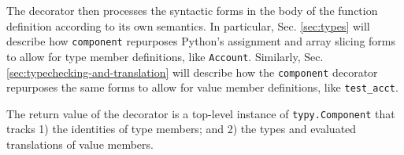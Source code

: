 \documentclass[10pt]{sigplanconf}
\newcommand{\typy}{\texttt{\footnotesize typy}}
\newcommand{\lip}[1]{\lstinline[language=Python,basicstyle=\ttfamily\footnotesize,morekeywords={with},deletendkeywords={tuple,buffer,map}]{#1}}
\newcommand{\li}[1]{\lip{#1}}
\begin{document}
The decorator then processes the syntactic forms in the body of the function definition according to its own semantics. In particular, Sec. \ref{sec:types} will describe how \lip{component} repurposes Python's assignment and array slicing forms to allow for type member definitions, like \li{Account}. Similarly, Sec. \ref{sec:typechecking-and-translation} will describe how the \lip{component} decorator repurposes the same forms to allow for value member definitions, like \li{test_acct}. 

The return value of the decorator is a top-level instance of \lip{typy.Component} that tracks 1) the identities of type members; and 2) the types and evaluated translations of value members. %

%


\end{document}
